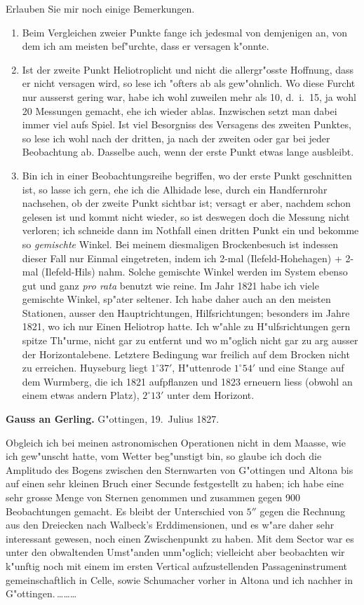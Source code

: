 \documentclass[12pt,a4paper]{article}
\theoremstyle{plain}
\theoremstyle{definition}
\theoremstyle{remark}
\begin{document}
\medskip
\noindent Erlauben Sie mir noch einige Bemerkungen.
\begin{enumerate}[label=\arabic*.]
\item Beim Vergleichen zweier Punkte fange ich jedesmal von demjenigen an, von dem ich am meisten bef"urchte, dass er versagen k"onnte.
\item Ist der zweite Punkt Heliotroplicht und nicht die allergr"osste Hoffnung, dass er nicht versagen wird, so lese ich "ofters ab als gew"ohnlich. Wo diese Furcht nur ausserst gering war, habe ich wohl zuweilen mehr als 10, d.\ i.\ 15, ja wohl 20 Messungen gemacht, ehe ich wieder ablas. Inzwischen setzt man dabei immer viel aufs Spiel. Ist viel Besorgniss des Versagens des zweiten Punktes, so lese ich wohl nach der dritten, ja nach der zweiten oder gar bei jeder Beobachtung ab. Dasselbe auch, wenn der erste Punkt etwas lange ausbleibt.
\item Bin ich in einer Beobachtungsreihe begriffen, wo der erste Punkt geschnitten ist, so lasse ich gern, ehe ich die Alhidade lese, durch ein Handfernrohr nachsehen, ob der zweite Punkt sichtbar ist; versagt er aber, nachdem schon gelesen ist und kommt nicht wieder, so ist deswegen doch die Messung nicht verloren; ich schneide dann im Nothfall einen dritten Punkt ein und bekomme so \emph{gemischte} Winkel. Bei meinem diesmaligen Brockenbesuch ist indessen dieser Fall nur Einmal eingetreten, indem ich 2-mal (Ilefeld-Hohehagen) + 2-mal (Ilefeld-Hils) nahm. Solche gemischte Winkel werden im System ebenso gut und ganz \emph{pro rata} benutzt wie reine. Im Jahr 1821 habe ich viele gemischte Winkel, sp"ater seltener. Ich habe daher auch an den meisten Stationen, ausser den Hauptrichtungen, Hilfsrichtungen; besonders im Jahre 1821, wo ich nur Einen Heliotrop hatte. Ich w"ahle zu H"ulfsrichtungen gern spitze Th"urme, nicht gar zu entfernt und wo m"oglich nicht gar zu arg ausser der Horizontalebene. Letztere Bedingung war freilich auf dem Brocken nicht zu erreichen. Huyseburg liegt $1^{\circ}37'$, H"uttenrode $1^{\circ}54'$ und eine Stange auf dem Wurmberg, die ich 1821 aufpflanzen und 1823 erneuern liess (obwohl an einem etwas andern Platz), $2^{\circ}13'$ unter dem Horizont.
\end{enumerate}

\medskip
\noindent \textbf{Gauss an Gerling.} G"ottingen, 19.~Julius 1827.

\medskip
\noindent Obgleich ich bei meinen astronomischen Operationen nicht in dem Maasse, wie ich gew"unscht hatte, vom Wetter beg"unstigt bin, so glaube ich doch die Amplitudo des Bogens zwischen den Sternwarten von G"ottingen und Altona bis auf einen sehr kleinen Bruch einer Secunde festgestellt zu haben; ich habe eine sehr grosse Menge von Sternen genommen und zusammen gegen 900 Beobachtungen gemacht. Es bleibt der Unterschied von $5''$ gegen die Rechnung aus den Dreiecken nach Walbeck's Erddimensionen, und es w"are daher sehr interessant gewesen, noch einen Zwischenpunkt zu haben. Mit dem Sector war es unter den obwaltenden Umst"anden unm"oglich; vielleicht aber beobachten wir k"unftig noch mit einem im ersten Vertical aufzustellenden Passageninstrument gemeinschaftlich in Celle, sowie Schumacher vorher in Altona und ich nachher in G"ottingen.\,\ldots\ldots\ldots
\end{document}
